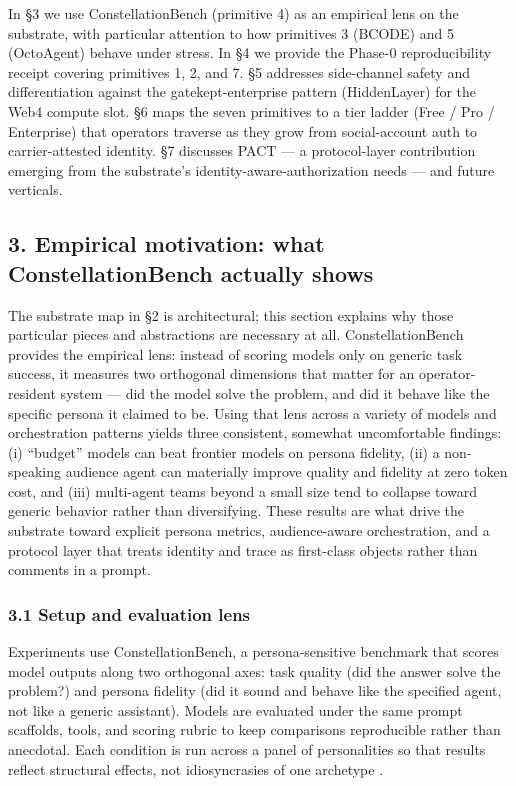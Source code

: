 In §3 we use ConstellationBench (primitive 4) as an empirical lens on
the substrate, with particular attention to how primitives 3 (BCODE) and
5 (OctoAgent) behave under stress. In §4 we provide the Phase-0
reproducibility receipt covering primitives 1, 2, and 7. §5 addresses
side-channel safety and differentiation against the gatekept-enterprise
pattern (HiddenLayer) for the Web4 compute slot. §6 maps the seven
primitives to a tier ladder (Free / Pro / Enterprise) that operators
traverse as they grow from social-account auth to carrier-attested
identity. §7 discusses PACT --- a protocol-layer contribution emerging
from the substrate's identity-aware-authorization needs --- and future
verticals.

\subsection{3. Empirical motivation: what ConstellationBench actually
shows}\label{empirical-motivation-what-constellationbench-actually-shows}

The substrate map in §2 is architectural; this section explains why
those particular pieces and abstractions are necessary at all.
ConstellationBench provides the empirical lens: instead of scoring
models only on generic task success, it measures two orthogonal
dimensions that matter for an operator-resident system --- did the model
solve the problem, and did it behave like the specific persona it
claimed to be. Using that lens across a variety of models and
orchestration patterns yields three consistent, somewhat uncomfortable
findings: (i) ``budget'' models can beat frontier models on persona
fidelity, (ii) a non-speaking audience agent can materially improve
quality and fidelity at zero token cost, and (iii) multi-agent teams
beyond a small size tend to collapse toward generic behavior rather than
diversifying. These results are what drive the substrate toward explicit
persona metrics, audience-aware orchestration, and a protocol layer that
treats identity and trace as first-class objects rather than comments in
a prompt.

\subsubsection{3.1 Setup and evaluation
lens}\label{setup-and-evaluation-lens}

Experiments use ConstellationBench, a persona-sensitive benchmark that
scores model outputs along two orthogonal axes: task quality (did the
answer solve the problem?) and persona fidelity (did it sound and behave
like the specified agent, not like a generic assistant). Models are
evaluated under the same prompt scaffolds, tools, and scoring rubric to
keep comparisons reproducible rather than anecdotal. Each condition is
run across a panel of personalities so that results reflect structural
effects, not idiosyncrasies of one archetype
\citep{constellationbench2026}.

